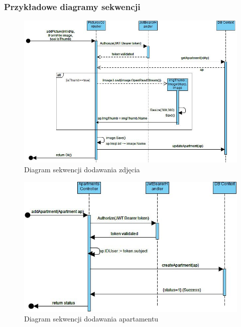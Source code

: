 \documentclass[polish, 11pt]{article}
\begin{document}
        \subsubsection{Przykładowe diagramy sekwencji}
            \begin{figure}[H]
                \centering
                \includegraphics[width=\textwidth]{figures/addPictureSeq.jpg}
                \caption{Diagram sekwencji dodawania zdjęcia}
            \end{figure}
            
            \begin{figure}[H]
                \centering
                \includegraphics[width=\textwidth]{figures/addApartmentSeq.jpg}
                \caption{Diagram sekwencji dodawania apartamentu}
            \end{figure}
            
\end{document}
